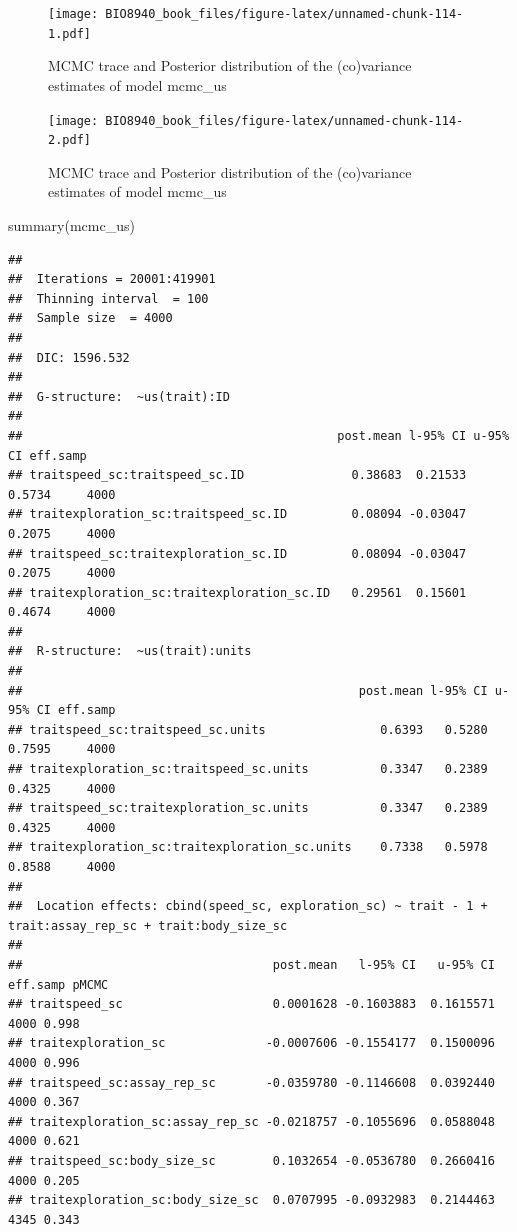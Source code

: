 \documentclass[
  12pt,
]{book}
\newenvironment{Shaded}{\begin{snugshade}}{\end{snugshade}}
\newcommand{\DecValTok}[1]{\textcolor[rgb]{0.00,0.00,0.81}{#1}}
\newcommand{\FunctionTok}[1]{\textcolor[rgb]{0.00,0.00,0.00}{#1}}
\newcommand{\NormalTok}[1]{#1}
\newcommand{\SpecialCharTok}[1]{\textcolor[rgb]{0.00,0.00,0.00}{#1}}
\begin{document}
\begin{figure}
\centering
\texttt{[image: BIO8940\_book\_files/figure-latex/unnamed-chunk-114-1.pdf]}
\caption{\label{fig:unnamed-chunk-114-1}MCMC trace and Posterior distribution of the (co)variance estimates of model mcmc\_us}
\end{figure}

\begin{Shaded}
\end{Shaded}

\begin{figure}
\centering
\texttt{[image: BIO8940\_book\_files/figure-latex/unnamed-chunk-114-2.pdf]}
\caption{\label{fig:unnamed-chunk-114-2}MCMC trace and Posterior distribution of the (co)variance estimates of model mcmc\_us}
\end{figure}

\begin{Shaded}
\begin{Highlighting}[]
\FunctionTok{summary}\NormalTok{(mcmc\_us)}
\end{Highlighting}
\end{Shaded}

\begin{verbatim}
## 
##  Iterations = 20001:419901
##  Thinning interval  = 100
##  Sample size  = 4000 
## 
##  DIC: 1596.532 
## 
##  G-structure:  ~us(trait):ID
## 
##                                            post.mean l-95% CI u-95% CI eff.samp
## traitspeed_sc:traitspeed_sc.ID               0.38683  0.21533   0.5734     4000
## traitexploration_sc:traitspeed_sc.ID         0.08094 -0.03047   0.2075     4000
## traitspeed_sc:traitexploration_sc.ID         0.08094 -0.03047   0.2075     4000
## traitexploration_sc:traitexploration_sc.ID   0.29561  0.15601   0.4674     4000
## 
##  R-structure:  ~us(trait):units
## 
##                                               post.mean l-95% CI u-95% CI eff.samp
## traitspeed_sc:traitspeed_sc.units                0.6393   0.5280   0.7595     4000
## traitexploration_sc:traitspeed_sc.units          0.3347   0.2389   0.4325     4000
## traitspeed_sc:traitexploration_sc.units          0.3347   0.2389   0.4325     4000
## traitexploration_sc:traitexploration_sc.units    0.7338   0.5978   0.8588     4000
## 
##  Location effects: cbind(speed_sc, exploration_sc) ~ trait - 1 + trait:assay_rep_sc + trait:body_size_sc 
## 
##                                   post.mean   l-95% CI   u-95% CI eff.samp pMCMC
## traitspeed_sc                     0.0001628 -0.1603883  0.1615571     4000 0.998
## traitexploration_sc              -0.0007606 -0.1554177  0.1500096     4000 0.996
## traitspeed_sc:assay_rep_sc       -0.0359780 -0.1146608  0.0392440     4000 0.367
## traitexploration_sc:assay_rep_sc -0.0218757 -0.1055696  0.0588048     4000 0.621
## traitspeed_sc:body_size_sc        0.1032654 -0.0536780  0.2660416     4000 0.205
## traitexploration_sc:body_size_sc  0.0707995 -0.0932983  0.2144463     4345 0.343
\end{verbatim}
\end{document}
